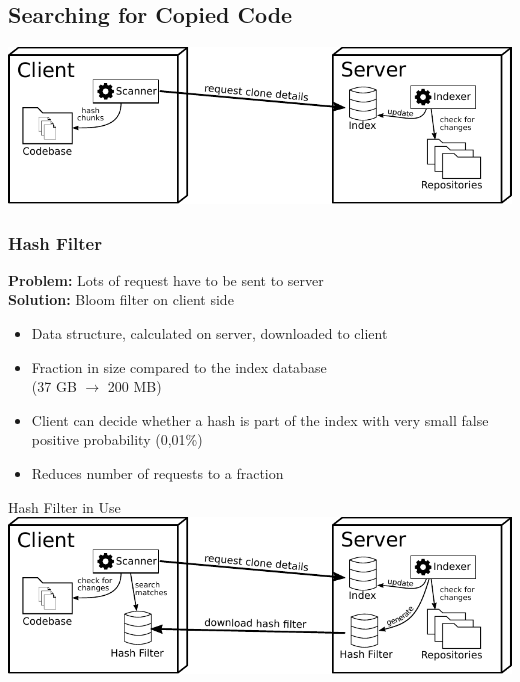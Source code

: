 \subsection{Searching for Copied Code}
\begin{frame}{\insertsubsection}
	\includegraphics[width=\linewidth]{fig/architecture_overview_search.pdf}
\end{frame}

\subsubsection{Hash Filter}
\begin{frame}{\insertsubsection}{\insertsubsubsection}
	\textbf{Problem:} Lots of request have to be sent to server\\
	\pause
	\vspace{2mm}
	\textbf{Solution:} Bloom filter on client side
	\vspace{2mm}
	\begin{itemize}
		\small
		\item Data structure, calculated on server, downloaded to client
		\item Fraction in size compared to the index database\\ (37 GB $\rightarrow$ 200 MB)
		\item Client can decide whether a hash is part of the index with very small false positive probability (0,01\%)
		\item Reduces number of requests to a fraction
	\end{itemize}
\end{frame}

\begin{frame}{\insertsubsection}{Hash Filter in Use}
	\includegraphics[width=\linewidth]{../written/figures/architecture_overview.pdf}
\end{frame}

